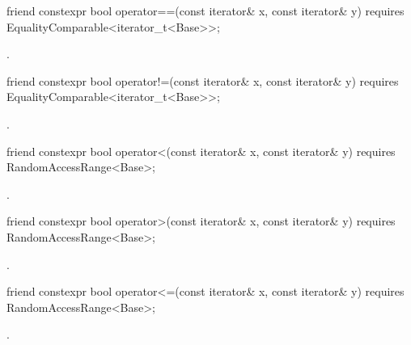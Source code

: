 \begin{itemdecl}
friend constexpr bool operator==(const iterator& x, const iterator& y)
  requires EqualityComparable<iterator_t<Base>>;
\end{itemdecl}

\begin{itemdescr}
\pnum
\returns {}.
\end{itemdescr}

%
\begin{itemdecl}
friend constexpr bool operator!=(const iterator& x, const iterator& y)
  requires EqualityComparable<iterator_t<Base>>;
\end{itemdecl}

\begin{itemdescr}
\pnum
\returns {}.
\end{itemdescr}

%
\begin{itemdecl}
friend constexpr bool operator<(const iterator& x, const iterator& y)
  requires RandomAccessRange<Base>;
\end{itemdecl}

\begin{itemdescr}
\pnum
\returns {}.
\end{itemdescr}

%
\begin{itemdecl}
friend constexpr bool operator>(const iterator& x, const iterator& y)
  requires RandomAccessRange<Base>;
\end{itemdecl}

\begin{itemdescr}
\pnum
\returns {}.
\end{itemdescr}

%
\begin{itemdecl}
friend constexpr bool operator<=(const iterator& x, const iterator& y)
  requires RandomAccessRange<Base>;
\end{itemdecl}

\begin{itemdescr}
\pnum
\returns {}.
\end{itemdescr}


